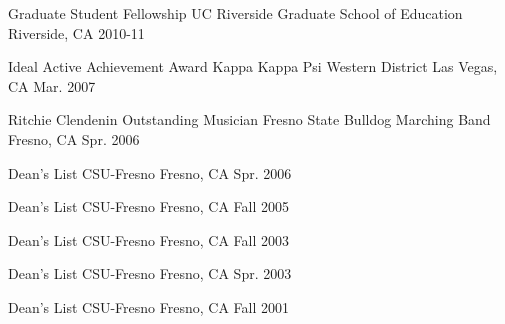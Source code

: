 

\begin{cvhonors}

  \cvhonor
    {Graduate Student Fellowship} %
    {UC Riverside Graduate School of Education} %
    {Riverside, CA} %
    {2010-11} %


  \cvhonor
    {Ideal Active Achievement Award} %
    {Kappa Kappa Psi Western District} %
    {Las Vegas, CA} %
    {Mar. 2007} %


  \cvhonor
    {Ritchie Clendenin Outstanding Musician} %
    {Fresno State Bulldog Marching Band} %
    {Fresno, CA} %
    {Spr. 2006} %


  \cvhonor
    {Dean's List} %
    {CSU-Fresno} %
    {Fresno, CA} %
    {Spr. 2006} %


  \cvhonor
    {Dean's List} %
    {CSU-Fresno} %
    {Fresno, CA} %
    {Fall 2005} %


  \cvhonor
    {Dean's List} %
    {CSU-Fresno} %
    {Fresno, CA} %
    {Fall 2003} %


  \cvhonor
    {Dean's List} %
    {CSU-Fresno} %
    {Fresno, CA} %
    {Spr. 2003} %


  \cvhonor
    {Dean's List} %
    {CSU-Fresno} %
    {Fresno, CA} %
    {Fall 2001} %



\end{cvhonors}

